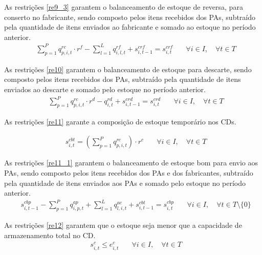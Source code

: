As restrições \ref{re9_3} garantem o balanceamento de estoque de reversa, para conserto no fabricante, sendo composto pelos itens recebidos dos PAs, subtraído pela quantidade de itens enviados ao fabricante e somado ao estoque no período anterior.
\begin{equation}\label{re9_3}
\begin{aligned}
& \sum_{p=1}^{P} q^{rc}_{p,i,t} \cdot r^{f} - \sum_{l=1}^{L} q^{rf}_{i,l,t} + s^{crf}_{i,t-1} = s^{crf}_{i,t} \quad & \forall i \in I, \quad \forall t \in T
\end{aligned}
\end{equation}

As restrições \ref{re10} garantem o balanceamento de estoque para descarte, sendo composto pelos itens recebidos dos PAs, subtraído pela quantidade de itens enviados ao descarte e somado pelo estoque no período anterior.
\begin{equation}\label{re10}
\begin{aligned}
& \sum_{p=1}^{P} q^{rc}_{p,i,t} \cdot r^{d} - q^{rd}_{i,t} + s^{crd}_{i,t-1} = s^{crd}_{i,t} \quad & \forall i \in I, \quad \forall t \in T
\end{aligned}
\end{equation}

As restrições \ref{re11} garante a composição de estoque temporário nos CDs.

\begin{equation}\label{re11}
\begin{aligned}
& s^{cbt}_{i,t} = \left( \sum_{p=1}^{P} q^{rc}_{p,i,t} \right) \cdot r^{c} \quad & \forall i \in I, \quad \forall t \in T
\end{aligned}
\end{equation}

As restrições \ref{re11_1} garantem o balanceamento de estoque bom para envio aos PAs, sendo composto pelos itens recebidos dos PAs e dos fabricantes, subtraído pela quantidade de itens enviados aos PAs e somado pelo estoque no período anterior.
\begin{equation}\label{re11_1}
\begin{aligned}
& s^{cbp}_{i,t-1} - \sum_{p=1}^{P} q^{ap}_{i,p,t} + \sum_{l=1}^{L} q^{ac}_{l,i,t} + s^{cbt}_{i,t-1} = s^{cbp}_{i,t} \quad & \forall i \in I, \quad \forall t \in T \setminus \{0\}
\end{aligned}
\end{equation}

As restrições \ref{re12} garantem que o estoque seja menor que a capacidade de armazenamento total no CD.
\begin{equation}\label{re12}
\begin{aligned}
& s^{c}_{i,t} \leq e^{c}_{i, t} \quad & \forall i \in I, \quad \forall t \in T
\end{aligned}
\end{equation}

